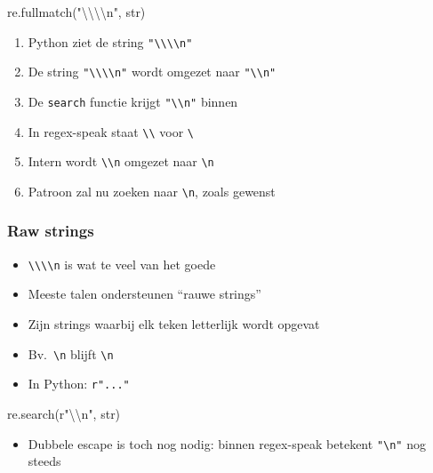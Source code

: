 \begin{frame}
\begin{overprint}
    \begin{center} \ttfamily
      re.fullmatch("\textbackslash\textbackslash\textbackslash\textbackslash n", str)
    \end{center}
    \begin{enumerate}
      \item Python ziet de string \texttt{"\textbackslash\textbackslash\textbackslash\textbackslash n"}
      \item De string \texttt{"\textbackslash\textbackslash\textbackslash\textbackslash n"} wordt omgezet naar \texttt{"\textbackslash\textbackslash n"}
      \item De \texttt{search} functie krijgt \texttt{"\textbackslash\textbackslash n"} binnen
      \item In regex-speak staat \texttt{\textbackslash\textbackslash} voor \texttt{\textbackslash}
      \item Intern wordt \texttt{\textbackslash\textbackslash n} omgezet naar \texttt{\textbackslash n}
      \item Patroon zal nu zoeken naar \texttt{\textbackslash n}, zoals gewenst
    \end{enumerate}
  \end{overprint}
\end{frame}

\begin{frame}
  \frametitle{Raw strings}
  \begin{itemize}
    \item \texttt{\textbackslash\textbackslash\textbackslash\textbackslash n} is wat te veel van het goede
    \item Meeste talen ondersteunen ``rauwe strings''
    \item Zijn strings waarbij elk teken letterlijk wordt opgevat
    \item Bv.~\texttt{\textbackslash n} blijft \texttt{\textbackslash n}
    \item In Python: \texttt{r"..."}
  \end{itemize}
  \begin{center} \ttfamily
    re.search(r"\textbackslash\textbackslash n", str)
  \end{center}
  \begin{itemize}
    \item Dubbele escape is toch nog nodig: binnen regex-speak betekent \texttt{"\textbackslash n"} nog steeds 
  \end{itemize}
\end{frame}

